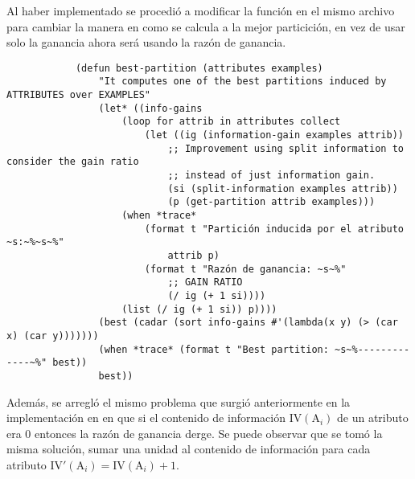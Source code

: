 \begin{itemize}
\begin{solution}
        Al haber implementado  se procedió a modificar la función  en el mismo archivo para cambiar la manera en como se calcula a la mejor particición, en vez de usar solo la ganancia ahora será usando la razón de ganancia.
        \begin{verbatim}
            (defun best-partition (attributes examples)
                "It computes one of the best partitions induced by ATTRIBUTES over EXAMPLES"
                (let* ((info-gains 
                    (loop for attrib in attributes collect
                        (let ((ig (information-gain examples attrib))
                            ;; Improvement using split information to consider the gain ratio
                            ;; instead of just information gain.
                            (si (split-information examples attrib))
                            (p (get-partition attrib examples)))
                    (when *trace*
                        (format t "Partición inducida por el atributo ~s:~%~s~%"
                            attrib p)
                        (format t "Razón de ganancia: ~s~%"
                            ;; GAIN RATIO
                            (/ ig (+ 1 si))))
                    (list (/ ig (+ 1 si)) p))))
                (best (cadar (sort info-gains #'(lambda(x y) (> (car x) (car y)))))))
                (when *trace* (format t "Best partition: ~s~%-------------~%" best))
                best))
        \end{verbatim}
        
        Además, se arregló el mismo problema que surgió anteriormente en la implementación en  en que si el contenido de información $\text{IV}(\text{A}_i)$ de un atributo era 0 entonces la razón de ganancia derge. Se puede observar que se tomó la misma solución, sumar una unidad al contenido de información para cada atributo $\text{IV}'(\text{A}_i) = \text{IV}(\text{A}_i) + 1$.


\end{solution}
\end{itemize}
